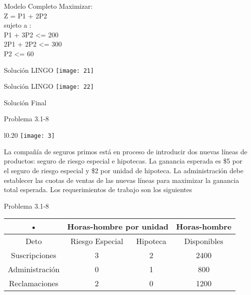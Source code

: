 \documentclass{beamer}
\begin{document}
\begin{frame}[fragile]{Modelo Completo}
Maximizar:\\
Z = P1 + 2P2\\
sujeto a :\\
P1 + 3P2  <= 200\\
2P1 + 2P2 <= 300\\
P2 <= 60\\
\end{frame}

\begin{frame}[fragile]{Solución LINGO}
    \texttt{[image: 21]}
\end{frame}
\begin{frame}[fragile]{Solución LINGO}
    \texttt{[image: 22]}
\end{frame}

\begin{frame}[fragile]{Solución Final}
\end{frame}

\begin{frame}[t,fragile]{Problema 3.1-8 }
\begin{wrapfigure}{l}{0.20\textwidth}
    \centering
    \texttt{[image: 3]}
\end{wrapfigure} La compañía de seguros primos está en proceso de introducir dos nuevas líneas de productos: seguro de riesgo especial e hipotecas. La ganancia esperada es \$5 por el seguro de riesgo especial y \$2 por unidad de hipoteca.
La administración debe establecer las cuotas de ventas de las nuevas líneas para maximizar la ganancia total esperada. Los requerimientos de trabajo son los siguientes\\
\end{frame}
\begin{frame}[t,fragile]{Problema 3.1-8 }

\begin{tabular}{|c|c|c|c|}
\hline 
• & \multicolumn{2}{c|}{Horas-hombre por unidad} & Horas-hombre \\ 
\hline 
Deto & Riesgo Especial & Hipoteca & Disponibles \\ 
\hline 
Suscripciones & 3 & 2 & 2400 \\ 
\hline 
Administración & 0 & 1 & 800 \\ 
\hline 
Reclamaciones & 2 & 0 & 1200 \\ 
\hline 
\end{tabular} 
\end{frame}
\end{document}
